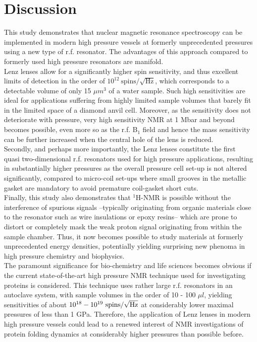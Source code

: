 \documentclass[aip,rsi,reprint,graphicx]{revtex4-1} %
\begin{document}
 \section{Discussion}
This study demonstrates that nuclear magnetic resonance spectroscopy can be implemented in modern high pressure vessels at formerly unprecedented pressures using a new type of r.f. resonator. The advantages of this approach compared to formerly used high pressure resonators are manifold.\\
Lenz lenses allow for a significantly higher spin sensitivity, and thus excellent limits of detection in the order of $10^{12}~\text{spins}/\sqrt{\text{Hz}}$, which corresponds to a detectable volume of only 15 $\mu m^3$ of a water sample. Such high sensitivities are ideal for applications suffering from highly limited sample volumes that barely fit in the limited space of a diamond anvil cell.  Moreover, as the sensitivity does not deteriorate with pressure, very high sensitivity NMR at 1 Mbar and beyond becomes possible, even more so as the r.f. B$_1$ field and hence the mass sensitivity can be further increased when the central hole of the lens is reduced.\\
 Secondly, and perhaps more importantly, the Lenz lenses constitute the first quasi two-dimensional r.f. resonators used for high pressure applications, resulting in substantially higher pressures as the overall pressure cell set-up is not altered significantly, compared to micro-coil set-ups where small grooves in the metallic gasket are mandatory to avoid premature coil-gasket short cuts.\\
Finally, this study also demonstrates that $^1$H-NMR is possible without the interference of spurious signals \---typically originating from organic materials close to the resonator such as wire insulations or epoxy resins\--- which are prone to distort or completely mask the weak proton signal originating from within the sample chamber. Thus, it now becomes possible to study
materials at formerly unprecedented energy densities, potentially yielding surprising new phenoma in high pressure chemistry and biophysics. \\
The paramount significance for bio-chemistry and life sciences becomes obvious if the current state-of-the-art high pressure NMR technique used for investigating proteins\cite{Ballard1997, Kremer2006} is considered. This technique uses rather large r.f. resonators in an autoclave system, with sample volumes in the order of 10 \-- 100 $\mu l$, yielding sensitivities of about $10^{18}\--10^{19}~\text{spins}/\sqrt{\text{Hz}}$ at considerably lower maximal pressures of less than 1 GPa\cite{Ballard1997, Arnold2003}. Therefore, the application of Lenz lenses in modern high pressure vessels could lead to a renewed interest of NMR investigations of protein folding dynamics at considerably higher pressures than possible before.
\end{document}
